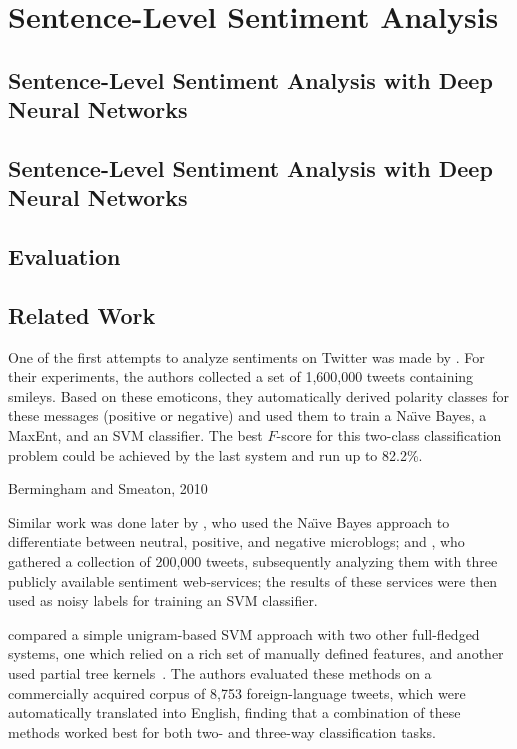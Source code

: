 \section{Sentence-Level Sentiment Analysis}\label{sec:snt:slsa}

\subsection{Sentence-Level Sentiment Analysis with Deep Neural Networks}

\subsection{Sentence-Level Sentiment Analysis with Deep Neural Networks}

\subsection{Evaluation}

\subsection{Related Work}

\citet{Hu:04}

\citet{Kim:04}

One of the first attempts to analyze sentiments on Twitter was made by
\citet{Go:09}.  For their experiments, the authors collected a set of
1,600,000 tweets containing smileys.  Based on these emoticons, they
automatically derived polarity classes for these messages (positive or
negative) and used them to train a Na\"{\i}ve Bayes, a MaxEnt, and an
SVM classifier.  The best $F$-score for this two-class classification
problem could be achieved by the last system and run up to 82.2\%.

Bermingham and Smeaton, 2010

Similar work was done later by \citet{Pak:10}, who used the Na\"{\i}ve
Bayes approach to differentiate between neutral, positive, and
negative microblogs; and \citet{Barbosa:10}, who gathered a collection
of 200,000 tweets, subsequently analyzing them with three publicly
available sentiment web-services; the results of these services were
then used as noisy labels for training an SVM classifier.

\citet{Agarwal:11} compared a simple unigram-based SVM approach with
two other full-fledged systems, one which relied on a rich set of
manually defined features, and another used partial tree
kernels~\cite{Moschitti:06}.  The authors evaluated these methods on a
commercially acquired corpus of 8,753 foreign-language tweets, which
were automatically translated into English, finding that a combination
of these methods worked best for both two- and three-way
classification tasks.

